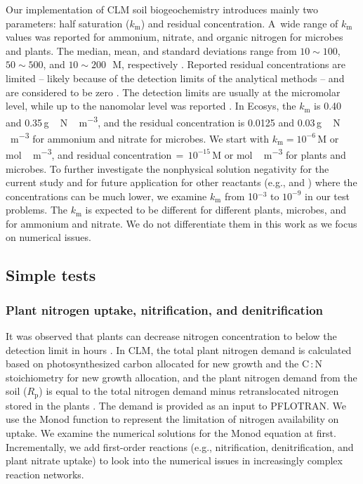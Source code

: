 \documentclass[gmdd, online, hvmath]{copernicus}
\begin{document}
      Our implementation of CLM soil biogeochemistry introduces mainly two
      parameters: half saturation ($k_\mathrm{m}$) and residual
      concentration. A~wide range of $k_\mathrm{m}$ values was reported for
      ammonium, nitrate, and organic nitrogen for microbes and plants. The
      median, mean, and standard deviations range from $10 \sim 100$, $50
      \sim 500$, and $10 \sim 200$\,\unit{{\mu}M}, respectively
      \citep{Kuzyakov2013}. Reported residual concentrations are limited --
      likely because of the detection limits of the analytical methods --
      and are considered to be zero \cite[e.g.,][]{Hogh1997}. The detection
      limits are usually at the micromolar level, while up to the nanomolar
      level was reported \citep{Nollet2013}. In Ecosys, the $k_\mathrm{m}$ is
      0.40 and 0.35\,\unit{g\,N\,m^{-3}}, and the residual concentration is
      0.0125 and 0.03\,\unit{g\,N\,m^{-3}} \citep{Grant2013} for ammonium
      and nitrate for microbes. We start with $k_\mathrm{m}=10^{-6}$\,\unit{M} or
      \unit{mol\,m^{-3}}, and residual
      concentration\,$=$\,$10^{-15}$\,\unit{M} or \unit{mol\,m^{-3}} for
      plants and microbes. To further investigate the nonphysical solution
      negativity for the current study and for future application for other
      reactants (e.g.,  and ) where the concentrations
      can be much lower, we examine $k_\mathrm{m}$ from 10$^{-3}$ to $10^{-9}$ in our
      test problems. The $k_\mathrm{m}$ is expected to be different for
      different plants, microbes, and for ammonium and nitrate. We do not
      differentiate them in this work as we focus on numerical issues.



\subsection{Simple tests}%

\subsubsection{Plant nitrogen uptake, nitrification, and denitrification}%
\label{sec:test1}

      It was observed that plants can decrease nitrogen concentration to
      below the detection limit in hours \citep{Kamer2001}. In CLM, the
      total plant nitrogen demand is calculated based on photosynthesized
      carbon allocated for new growth and the C\,:\,N stoichiometry for new
      growth allocation, and the plant nitrogen demand from the soil
      ($R_\mathrm{p}$) is equal to the total nitrogen demand minus
      retranslocated nitrogen stored in the plants \citep{Oleson2013}. The
      demand is provided as an input to PFLOTRAN. We use the Monod function
      to represent the limitation of nitrogen availability on uptake.  We
      examine the numerical solutions for the Monod equation at
      first. Incrementally, we add first-order reactions (e.g.,
      nitrification, denitrification, and plant nitrate uptake) to look into
      the numerical issues in increasingly complex reaction networks.
\end{document}

